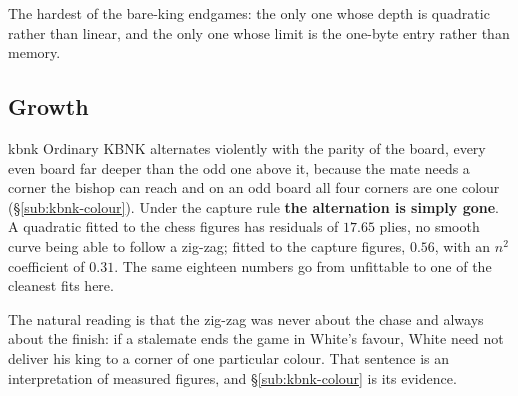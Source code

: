 \documentclass[10pt]{article}
\begin{document}
\noindent
The hardest of the bare-king endgames: the only one whose depth is quadratic
rather than linear, and the only one whose limit is the one-byte entry rather
than memory.

\subsection{Growth}\label{sub:kbnk-growth}

\begin{center}
\end{center}

\begin{result}[title={The parity zig-zag is a mating artefact, and the capture rule deletes it}]{kbnk}
Ordinary KBNK alternates violently with the parity of the board, every even
board far deeper than the odd one above it, because the mate needs a corner the
bishop can reach and on an odd board all four corners are one colour
(\S\ref{sub:kbnk-colour}). Under the capture rule \textbf{the alternation is
simply gone}. A quadratic fitted to the chess figures has residuals of $17.65$
plies, no smooth curve being able to follow a zig-zag; fitted to the capture
figures, $\mathbf{0.56}$, with an $n^2$ coefficient of $0.31$. The same
eighteen numbers go from unfittable to one of the cleanest fits here.

\smallskip
The natural reading is that the zig-zag was never about the chase and always
about the finish: if a stalemate ends the game in White's favour, White need
not deliver his king to a corner of one particular colour. That sentence is an
interpretation of measured figures, and \S\ref{sub:kbnk-colour} is its
evidence.
\end{result}
\end{document}
